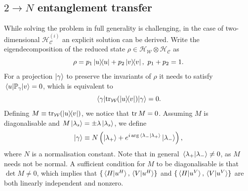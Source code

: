 \documentclass[
	aps, pra,
	superscriptaddress, twocolumn,
	floatfix,
	10pt
]{revtex4-1}
\newcommand{\parTitle}[1]{\noindent{\color{Mahogany}(\emph{#1})}}
\newcommand{\PP}{\mathbb{P}}
\newcommand{\calC}{{\mathcal{C}}}
\newcommand{\calH}{{\mathcal{H}}}
\newcommand{\calW}{{\mathcal{W}}}
\begin{document}
\subsection{\texorpdfstring{$2\to N$}{2->N} entanglement transfer}

\parTitle{Problem setting}
While solving the problem in full generality is challenging, in the case of two-dimensional $\calH^{(i)}_{\calC}$ an explicit solution can be derived.
Write the eigendecomposition of the reduced state $\rho\in\calH_{\calW}\otimes\calH_{\calC}$ as
\begin{equation}
	\rho= p_1 \ketbra{u} + p_2 \ketbra{v}, \,\,p_1+p_2=1.
\end{equation}
For a projection $\ket\gamma$ to preserve the invariants of $\rho$ it needs to satisfy
$\mel{u}{\PP_\gamma}{v}=0$, which is equivalent to
\begin{equation}
	\mel{\gamma}{\tr_{\calW}(\ketbra{u}{v})}{\gamma} = 0.
\end{equation}
Defining $M\equiv \tr_{\calW}(\ketbra{u}{v})$, we notice that $\tr M=0$.
Assuming $M$ is diagonalisable and $M\ket{\lambda_s}=\pm\lambda\ket{\lambda_s}$, we define
\begin{equation}
    \ket\gamma\equiv N\left(
        \ket{\lambda_+} +
        e^{i\arg\braket*{\lambda_-}{\lambda_+}} \ket{\lambda_-}
    \right),
    \label{eq:definition_projgamma_2dcase}
\end{equation}
where $N$ is a normalisation constant. Note that in general $\braket*{\lambda_+}{\lambda_-}\neq0$, as $M$ needs not be normal.
A sufficient condition for $M$ to be diagonalisable is that $\det M\neq0$, which implies that
$\{\braket*{H}{u^H},\braket*{V}{u^H}\}$ and
$\{\braket*{H}{u^V},\braket*{V}{u^V}\}$
are both linearly independent and nonzero.
\end{document}
